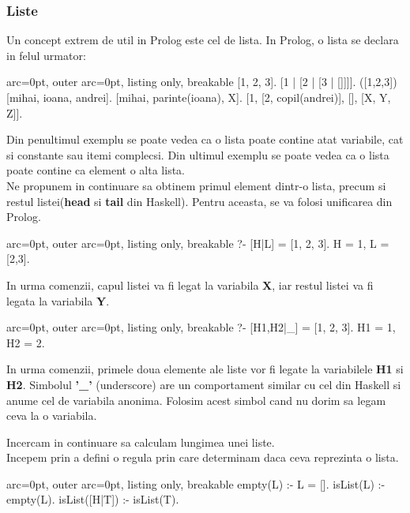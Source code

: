 \subsubsection*{ Liste }
Un concept extrem de util in Prolog este cel de lista. In Prolog, o lista se declara in felul urmator:

\begin{tcblisting}{ arc=0pt, outer arc=0pt, listing only, breakable}
[1, 2, 3].
[1 | [2 | [3 | []]]]. ([1,2,3])
[mihai, ioana, andrei].
[mihai, parinte(ioana), X].
[1, [2, copil(andrei)], [], [X, Y, Z]].


\end{tcblisting}


Din penultimul exemplu se poate vedea ca o lista poate contine atat variabile, cat si constante sau itemi complecsi. Din ultimul exemplu se poate vedea ca o lista poate contine ca element o alta lista. \\Ne propunem in continuare sa obtinem primul element dintr-o lista, precum si restul listei(\textbf{head} si \textbf{tail} din Haskell). Pentru aceasta, se va folosi unificarea din Prolog.


\begin{tcblisting}{ arc=0pt, outer arc=0pt, listing only, breakable}
?- [H|L] = [1, 2, 3].
H = 1,
L = [2,3].

\end{tcblisting}

In urma comenzii, capul listei va fi legat la variabila \textbf{X}, iar restul listei va fi legata la variabila \textbf{Y}.


\begin{tcblisting}{ arc=0pt, outer arc=0pt, listing only, breakable}
?- [H1,H2|_] = [1, 2, 3].
H1 = 1,
H2 = 2.

\end{tcblisting}

In urma comenzii, primele doua elemente ale liste vor fi legate la variabilele \textbf{H1} si \textbf{H2}. Simbolul \textbf{'\_'} (underscore) are un comportament similar cu cel din Haskell si anume cel de variabila anonima. Folosim acest simbol cand nu dorim sa legam ceva la o variabila.

Incercam in continuare sa calculam lungimea unei liste. \\Incepem prin a defini o regula prin care determinam daca ceva reprezinta o lista.

\begin{tcblisting}{ arc=0pt, outer arc=0pt, listing only, breakable}
empty(L) :- L = [].
isList(L) :- empty(L).
isList([H|T]) :- isList(T).

\end{tcblisting}


